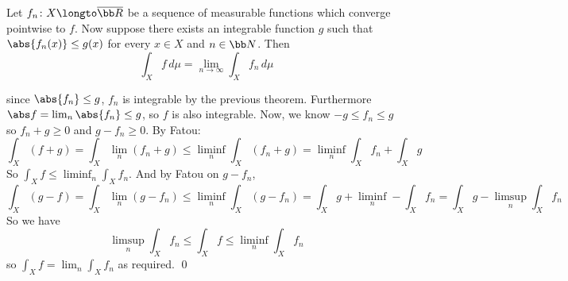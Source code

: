 \bthrm[title=Dominated Convergence Theorem, name=domconv]

    Let $f_n\colon X\longto\overline{\bb R}$ be a sequence of measurable functions which converge pointwise to $f$.
    Now suppose there exists an integrable function $g$ such that $\abs{f_n(x)}\leq g(x)$ for every $x\in X$ and $n\in{\bb N}$.
    Then
    $$ \int_Xf\,d\mu = \lim_{n\to\infty}\int_Xf_n\,d\mu $$

\ethrm

\Proof since $\abs{f_n}\leq g$, $f_n$ is integrable by the previous theorem.
Furthermore $\abs f=\lim_n\abs{f_n}\leq g$, so $f$ is also integrable.
Now, we know $-g\leq f_n\leq g$ so $f_n+g\geq0$ and $g-f_n\geq0$.
By Fatou:
$$ \int_X(f+g) = \int_X\lim_n(f_n+g) \leq \liminf_n\int_X(f_n+g) = \liminf_n\int_Xf_n + \int_Xg $$
So $\int_Xf\leq\liminf_n\int_Xf_n$.
And by Fatou on $g-f_n$,
$$ \int_X(g-f) = \int_X\lim_n(g-f_n) \leq \liminf_n\int_X(g-f_n) = \int_Xg + \liminf_n-\int_Xf_n = \int_Xg - \limsup_n\int_Xf_n $$
So we have
$$ \limsup_n\int_Xf_n \leq \int_Xf \leq \liminf_n\int_Xf_n $$
so $\int_Xf=\lim_n\int_Xf_n$ as required.
\qed

\bye

